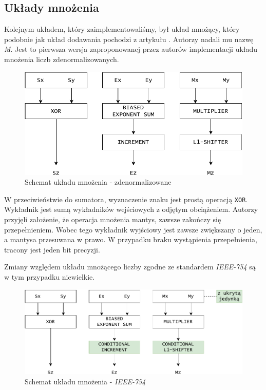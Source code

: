 \documentclass{article}
\begin{document}
\subsection{Układy mnożenia}

Kolejnym układem, który zaimplementowaliśmy, był układ mnożący, który podobnie jak układ dodawania pochodzi z artykułu \cite{art:old}.
Autorzy nadali mu nazwę \emph{M}.
Jest to pierwsza wersja zaproponowanej przez autorów implementacji układu mnożenia liczb zdenormalizowanych.

\begin{figure}[H]
	\centering
	\includegraphics[width=\textwidth]{figures/diagram_mul_denorm.pdf}
	\caption{Schemat układu mnożenia - zdenormalizowane}
	\label{fig:diagram_mul_denorm}
\end{figure}

W przeciwieństwie do sumatora, wyznaczenie znaku jest prostą operacją \texttt{XOR}.
Wykładnik jest sumą wykładników wejściowych z odjętym obciążeniem.
Autorzy przyjęli założenie, że operacja mnożenia mantys, zawsze zakończy się przepełnieniem.
Wobec tego wykładnik wyjściowy jest zawsze zwiększany o jeden, a mantysa przesuwana w prawo.
W przypadku braku wystąpienia przepełnienia, tracony jest jeden bit precyzji.

Zmiany względem układu mnożącego liczby zgodne ze standardem \emph{IEEE-754} są w tym przypadku niewielkie.

\begin{figure}[H]
	\centering
	\includegraphics[width=\textwidth]{figures/diagram_mul_ieee754.pdf}
	\caption{Schemat układu mnożenia - \emph{IEEE-754}}
	\label{fig:diagram_mul_ieee754}
\end{figure}
\end{document}
